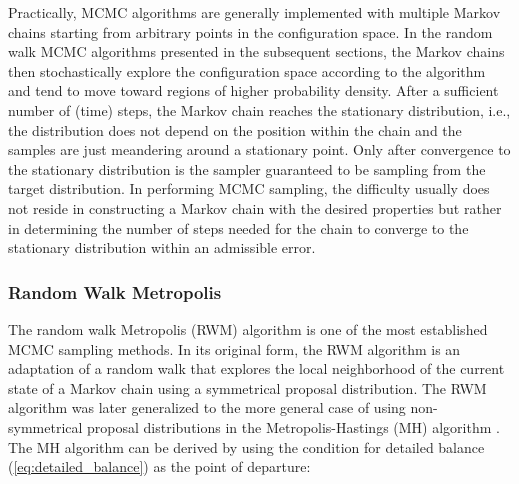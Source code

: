 Practically, MCMC algorithms are generally implemented with multiple Markov chains starting from arbitrary points in the configuration space. In the random walk MCMC algorithms presented in the subsequent sections, the Markov chains then stochastically explore the configuration space according to the algorithm and tend to move toward regions of higher probability density. After a sufficient number of (time) steps, the Markov chain reaches the stationary distribution, i.e., the distribution does not depend on the position within the chain and the samples are just meandering around a stationary point. Only after convergence to the stationary distribution is the sampler guaranteed to be sampling from the target distribution. In performing MCMC sampling, the difficulty usually does not reside in constructing a Markov chain with the desired properties but rather in determining the number of steps needed for the chain to converge to the stationary distribution within an admissible error. 






\subsubsection{Random Walk Metropolis}\label{sec:rwm}

The random walk Metropolis (RWM) algorithm \citep{Metropolis} is one of the most established MCMC sampling methods. In its original form, the RWM algorithm is an adaptation of a random walk that explores the local neighborhood of the current state of a Markov chain using a symmetrical proposal distribution. The RWM algorithm was later generalized to the more general case of using non-symmetrical proposal distributions in the Metropolis-Hastings (MH) algorithm \citep{Hastings}. The MH algorithm can be derived by using the condition for detailed balance (\autoref{eq:detailed_balance}) as the point of departure: 

